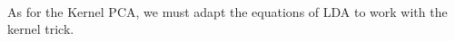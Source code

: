 \paragraph{}
As for the Kernel PCA, we must adapt the equations of LDA to work with the kernel trick.
